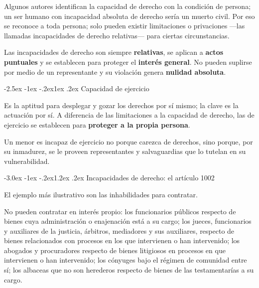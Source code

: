 \documentclass[12pt,oneside]{book}
\makeatletter
\renewcommand\section{\@startsection{section}{1}{\z@}%
  {-3.0ex \@plus -1ex \@minus -.2ex}{1.2ex \@plus .2ex}%
  {\normalfont\large\bfseries\color{acento}}}
\renewcommand\subsection{\@startsection{subsection}{2}{\z@}%
  {-2.5ex \@plus -1ex \@minus -.2ex}{1ex \@plus .2ex}%
  {\normalfont\normalsize\bfseries}}
\makeatother
\begin{document}
Algunos autores identifican la capacidad de derecho con la condición de persona; un ser humano con incapacidad absoluta de derecho sería un muerto civil. Por eso se reconoce a toda persona; solo pueden existir limitaciones o privaciones ---las llamadas incapacidades de derecho relativas--- para ciertas circunstancias.

\begin{importante}
Las incapacidades de derecho son siempre \textbf{relativas}, se aplican a \textbf{actos puntuales} y se establecen para proteger el \textbf{interés general}. No pueden suplirse por medio de un representante y su violación genera \textbf{nulidad absoluta}.
\end{importante}

\subsection{Capacidad de ejercicio}

Es la aptitud para desplegar y gozar los derechos por sí mismo; la clave es la actuación por sí. A diferencia de las limitaciones a la capacidad de derecho, las de ejercicio se establecen para \textbf{proteger a la propia persona}.

\begin{ejemplo}
Un menor es incapaz de ejercicio no porque carezca de derechos, sino porque, por su inmadurez, se le proveen representantes y salvaguardias que lo tutelan en su vulnerabilidad.
\end{ejemplo}

\section{Incapacidades de derecho: el artículo 1002}

El ejemplo más ilustrativo son las inhabilidades para contratar.

\begin{regla}
No pueden contratar en interés propio: los funcionarios públicos respecto de bienes cuya administración o enajenación está a su cargo; los jueces, funcionarios y auxiliares de la justicia, árbitros, mediadores y sus auxiliares, respecto de bienes relacionados con procesos en los que intervienen o han intervenido; los abogados y procuradores respecto de bienes litigiosos en procesos en que intervienen o han intervenido; los cónyuges bajo el régimen de comunidad entre sí; los albaceas que no son herederos respecto de bienes de las testamentarías a su cargo.
\end{regla}
\end{document}
